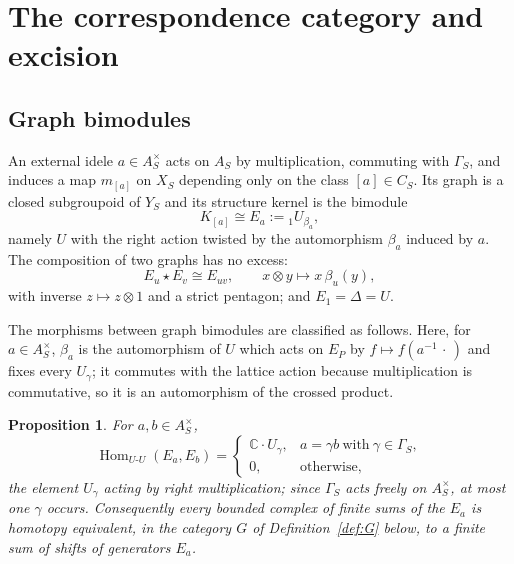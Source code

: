 \documentclass[11pt]{amsart}
\newtheorem{proposition}[theorem]{Proposition}
\theoremstyle{definition}
\theoremstyle{remark}
\newcommand{\C}{\mathbb C}
\newcommand{\Hom}{\operatorname{Hom}}
\begin{document}
\section{The correspondence category and excision}\label{sec:cat}

\subsection{Graph bimodules}

An external idele $a\in A_S^{\times}$ acts on $A_S$ by multiplication,
commuting with $\Gamma_S$, and induces a map $m_{[a]}$ on $X_S$ depending only
on the class $[a]\in C_S$.  Its graph is a closed subgroupoid of $Y_S$ and its
structure kernel is the bimodule
\begin{equation}\label{eq:graphbimod}
K_{[a]}\cong E_a:={}_{1}U_{\beta_a},
\end{equation}
namely $U$ with the right action twisted by the automorphism $\beta_a$ induced
by $a$.  The composition of two graphs has no excess:
\begin{equation}\label{eq:starmult}
E_u\star E_v\cong E_{uv},\qquad x\otimes y\mapsto x\,\beta_u(y),
\end{equation}
with inverse $z\mapsto z\otimes 1$ and a strict pentagon; and $E_1=\Delta=U$.

The morphisms between graph bimodules are classified as follows.  Here, for
$a\in A_S^{\times}$, $\beta_a$ is the automorphism of $U$ which acts on $E_P$
by $f\mapsto f(a^{-1}\,\cdot\,)$ and fixes every $U_{\gamma}$; it commutes with
the lattice action because multiplication is commutative, so it is an
automorphism of the crossed product.

\begin{proposition}\label{prop:hom}
For $a,b\in A_S^{\times}$,
\begin{equation}\label{eq:homclass}
\Hom_{U\text{-}U}(E_a,E_b)=
\begin{cases}
\C\cdot U_{\gamma}, & a=\gamma b\ \text{with}\ \gamma\in\Gamma_S,\\
0, & \text{otherwise},
\end{cases}
\end{equation}
the element $U_{\gamma}$ acting by right multiplication; since $\Gamma_S$ acts
freely on $A_S^{\times}$, at most one $\gamma$ occurs.  Consequently every
bounded complex of finite sums of the $E_a$ is homotopy equivalent, in the
category $G$ of Definition~\ref{def:G} below, to a finite sum of shifts of
generators $E_a$.
\end{proposition}
\end{document}
